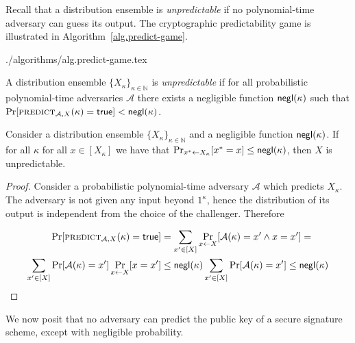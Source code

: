 Recall that a distribution ensemble is \emph{unpredictable} if no
polynomial-time adversary can guess its output. The cryptographic
predictability game is illustrated in Algorithm~\ref{alg.predict-game}.

{./algorithms/alg.predict-game.tex}

\begin{definition}
  A distribution ensemble $\{X_{\kappa}\}_{\kappa\in\mathbb{N}}$ is
  \emph{unpredictable} if for all probabilistic polynomial-time adversaries
  $\mathcal{A}$ there exists a negligible function $\textsf{negl}(\kappa)$ such that
  $\Pr[\textsc{predict}_{\mathcal{A},X}(\kappa) = \mathsf{true}] < \textsf{negl}(\kappa)$.
\end{definition}

\begin{lemma}\label{lem:negl-pred}
  Consider a distribution ensemble $\{X_{\kappa}\}_{\kappa\in\mathbb{N}}$ and
  a negligible function $\textsf{negl}(\kappa)$. If for all $\kappa$ for all
  $x \in [X_\kappa]$ we have that
  $\Pr_{x^* \gets X_\kappa}[x^* = x] \leq \textsf{negl}(\kappa)$, then
  $X$ is unpredictable.
\end{lemma}
\begin{proof}
  Consider a probabilistic polynomial-time adversary $\mathcal{A}$ which
  predicts $X_\kappa$. The adversary is not given any input beyond $1^\kappa$,
  hence the distribution of its output is independent from the choice of the
  challenger. Therefore

  \begin{align*}
  \Pr[\textsc{predict}_{\mathcal{A},X}(\kappa) = \mathsf{true}] &=
  \sum_{x' \in [X]}\Pr_{x \gets X}[\mathcal{A}(\kappa) = x'\land x = x'] =\\
  \sum_{x' \in [X]}\Pr[\mathcal{A}(\kappa) = x']\Pr_{x \gets X}[x = x']
  &\leq \textsf{negl}(\kappa)\sum_{x' \in [X]}\Pr[\mathcal{A}(\kappa) = x']
  \leq \textsf{negl}(\kappa)
  \end{align*}
\end{proof}

We now posit that no adversary can predict the public key of a secure signature scheme, except with negligible probability.

